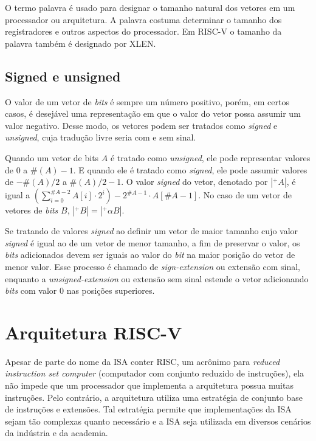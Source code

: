   O termo palavra é usado para designar o tamanho natural dos vetores em um processador ou arquitetura. 
  A palavra costuma determinar o tamanho dos registradores e outros aspectos do processador. 
  Em RISC-V o tamanho da palavra também é designado por XLEN.

\subsection{Signed e unsigned}
\label{sec:seu}

  O valor de um vetor de \emph{bits} é sempre um número positivo, porém, em certos casos, é desejável
  uma representação em que o valor do vetor possa assumir um valor negativo. Desse modo, os vetores
  podem ser tratados como \emph{signed} e \emph{unsigned}, cuja tradução livre seria com e sem sinal.

  Quando um vetor de bits $A$ é tratado como \emph{unsigned}, ele pode representar valores de $0$ a
  $\#(A) - 1$. E quando ele é tratado como \emph{signed}, ele pode assumir valores de $-\#(A)/2$ a 
  $\#(A)/2 - 1$. O valor \emph{signed} do vetor, denotado por $|^+A|$, é igual a $(\sum_{i =0}^{\#A-2}
  A[i]\cdot 2^i)-2^{\#A -1}\cdot A[\#A-1]$. No caso de um vetor de vetores de \emph{bits} $B$, 
  $|^+B| = |^+\alpha B|$.

  Se tratando de valores \emph{signed} ao definir um vetor de maior tamanho cujo valor 
  \emph{signed} é igual ao de um vetor de menor tamanho, a fim de
  preservar o valor, os \emph{bits} adicionados 
  devem ser iguais ao valor do \emph{bit} na maior posição do vetor de menor valor. Esse processo é 
  chamado de \emph{sign-extension} ou extensão com sinal, enquanto a \emph{unsigned-extension} ou extensão
  sem sinal estende o vetor adicionando \emph{bits} com valor $0$ nas posições superiores.

\newpage
\section{Arquitetura RISC-V}
\label{cap:isa}
  
  Apesar de parte do nome da ISA conter RISC, um acrônimo para \emph{reduced 
  instruction set computer} (computador com conjunto reduzido de instruções), 
  ela não impede que um processador que implementa a arquitetura possua muitas
  instruções. Pelo contrário, a arquitetura utiliza uma estratégia de conjunto base de 
  instruções e extensões. Tal estratégia permite que implementações da ISA sejam tão complexas
  quanto necessário e a ISA seja utilizada em diversos cenários da indústria e da academia.
  
